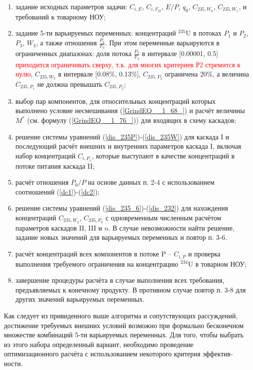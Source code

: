 \begin{enumerate}
    \item задание исходных параметров задачи: $C_{i,E}$, $C_{i,F_D}$, $E/P$, $q_0$, $C_{235,{W_0}}$, $C_{235,{W_1}}$, и требований к товарному НОУ;
    \item задание 5-ти варьируемых переменных: концентраций $^{235}$U в потоках $P_1$ и $P_2$, $P_3$, $W_3$, а также отношения $\frac{P_{2}}{F_3}$. При этом переменные варьируются в ограниченных диапазонах: доля потока $\frac{P_{2}}{F_3}$ в интервале [0.00001, 0.5] 
    \textcolor{red}{приходится ограничивать сверху, т.к. для многих критериев Р2 стремится к нулю}, $C_{235,{W_3}}$ в интервале [0.08\%, 0.13\%], $C_{235,{P_2}}$ ограничена 20\%, а величина $C_{235,{P_1}}$ не должна превышать $C_{235,{P_2}}$;
    \item выбор пар компонентов, для относительных концентраций которых выполнено условие несмешивания (\ref{GrindEQ__1_68_}) и расчёт величины $M^{*}$ (см. формулу (\ref{GrindEQ__1_76_})) для входящих в схему каскадов;
    \item решение системы уравнений (\ref{dis_235P})-(\ref{dis_235W}) для каскада I и последующий расчёт внешних и внутренних параметров каскада I, включая набор концентраций $C_{i,{P_1}}$, которые выступают в качестве концентраций в потоке питания каскада II;
    \item расчёт отношения ${P_0}/P$ на основе данных п. 2-4 с использованием соотношений (\ref{dc1})-(\ref{dc2});
    \item решение системы уравнений (\ref{dis_235_6})-(\ref{dis_232}) для нахождения концентраций $C_{235,{W_2}}$, $C_{235,{P_0}}$ с одновременным численным расчётом параметров каскадов II, III и $n$. В случае невозможности найти решение, задание новых значений для варьируемых переменных и повтор п. 3-6. 
    \item расчёт концентраций всех компонентов в потоке P -- $C_{i, P}$ и проверка выполнения требуемого ограничения на концентрацию $^{234}$U в товарном НОУ;
    \item завершение процедуры расчёта в случае выполнения всех требования, предъявляемых к конечному продукту. В противном случае повтор п. 3-8 для других значений варьируемых переменных.
\end{enumerate}

Как следует из привиденного выше алгоритма и сопутствующих рас­суждений, достижение требуемых внешних условий возможно при формально бесконечном множестве комбинаций 5-ти варьируемых переменных. Для того, чтобы выбрать из этого набора определенный вариант, необходимо проведение оптимизационного расчёта с использованием некоторого критерия эффектив­ности.

